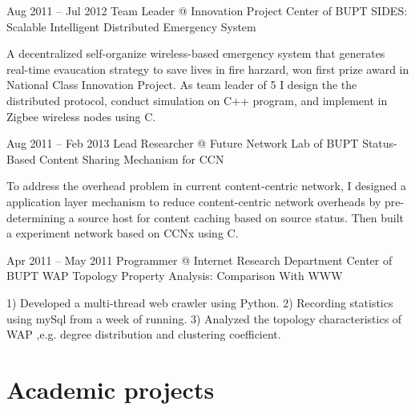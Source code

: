 \documentclass{tccv}
\begin{document}
\begin{eventlist}
\item{Aug 2011 -- Jul 2012}
     {Team Leader @ Innovation Project Center of BUPT}
     {SIDES: Scalable Intelligent Distributed Emergency System}
     
     A decentralized self-organize wireless-based emergency system that generates real-time evaucation strategy to save lives in fire harzard, won first prize award in National Class Innovation Project. As team leader of 5 I design the the distributed protocol, conduct simulation on C++ program, and implement in Zigbee wireless nodes using C.\newline
     
\item{Aug 2011 -- Feb 2013}
     {Lead Researcher @ Future Network Lab of BUPT}
     {Status-Based Content Sharing Mechanism for CCN}
     
     To address the overhead problem in current content-centric network, I designed a application layer mechanism to reduce content-centric network overheads by pre-determining a source host for content caching based on source status. Then built a experiment network based on CCNx using C.\newline
     

\item{Apr 2011 -- May 2011}
     {Programmer @ Internet Research Department Center of BUPT}
     {WAP Topology Property Analysis: Comparison With WWW}     
     
1) Developed a multi-thread web crawler using Python. 2) Recording statistics using mySql from a week of running. 3) Analyzed the topology characteristics of WAP ,e.g. degree distribution and clustering coefficient.\newline
     
\end{eventlist}















\section{Academic projects}
\end{document}
